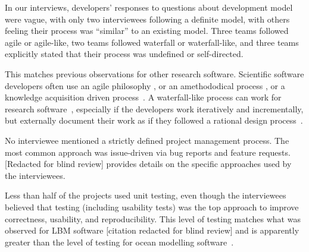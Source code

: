 \documentclass[doubleblind,12pt, 3p, times]{elsarticle}
\begin{document}
In our interviews, developers' responses to questions about development model
were vague, with only two interviewees following a definite model, with others
feeling their process was ``similar'' to an existing model.  Three teams
followed agile or agile-like, two teams followed waterfall or waterfall-like,
and three teams explicitly stated that their process was undefined or
self-directed.

This matches previous observations for other research software.  Scientific
software developers often use an agile philosophy \cite{AckroydEtAl2008,
CarverEtAl2007, EasterbrookAndJohns2009, Segal2005, HeatonAndCarver2015}, or an
amethododical process \cite{Kelly2013}, or a knowledge acquisition driven
process~\cite{Kelly2015}.  A waterfall-like process can work for research
software~\cite{Smith2016}, especially if the developers work iteratively and
incrementally, but externally document their work as if they followed a rational
design process~\cite{parnas1986rational}.

No interviewee mentioned a strictly defined project management process. The most
common approach was issue-driven via bug reports and feature requests.
[Redacted for blind review] %
provides details on the specific approaches used by the interviewees.
% 

Less than half of the projects used unit testing, even
though the interviewees believed that testing (including usability tests) was
the top approach to improve correctness, usability, and reproducibility.  This
level of testing matches what was observed for LBM
software [citation redacted for blind review]
and is apparently greater than the level of
testing for ocean modelling software~\cite{JungEtAl2022}.
\end{document}
